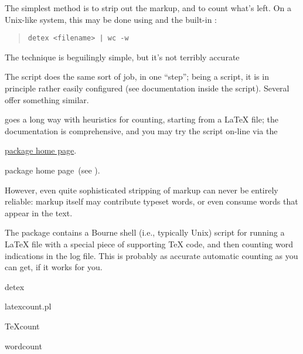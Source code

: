 The simplest method is to strip out the \AllTeX{} markup, and to count
what's left.  On a  Unix-like system, this may be done using
 and the built-in :
\begin{quote}
\begin{verbatim}
detex <filename> | wc -w
\end{verbatim}
\end{quote}
The technique is beguilingly simple, but it's not terribly accurate

The  script does the same sort of job, in one
``step''; being a  script, it is in principle rather
easily configured (see documentation inside the script).
Several  offer something similar.

 goes a long way with heuristics for counting,
starting from a \LaTeX{} file; the documentation is comprehensive, and
you may try the script on-line via the %
\begin{hyperversion}
  \href{http://folk.uio.no/einarro/Comp/texwordcount.html}{package home page}.
\end{hyperversion}
\begin{flatversion}
  package home page~(see
  ).
\end{flatversion}

However, even quite sophisticated stripping of \AllTeX{} markup can
never be entirely reliable: markup itself may contribute typeset
words, or even consume words that appear in the text.

The  package
contains a Bourne shell (i.e., typically Unix) script for running a
\LaTeX{} file with a special piece of supporting \TeX{} code, and then
counting word indications in the log file.  This is probably as
accurate automatic counting as you can get, if it works for you.
\begin{ctanrefs}
\item[detex]
\item[latexcount.pl]
\item[TeXcount]
\item[wordcount]
\end{ctanrefs}

